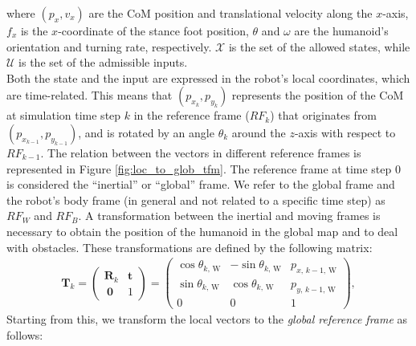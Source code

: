 where $(p_x, v_x)$ are the CoM position and translational velocity along the $x$-axis, $f_x$ is the $x$-coordinate of the stance foot position, $\theta$ and $\omega$ are the humanoid's orientation and turning rate, respectively. $\mathcal{X}$ is the set of the allowed states, while $\mathcal{U}$ is the set of the admissible inputs.\\
Both the state and the input are expressed in the robot's local coordinates, which are time-related. This means that $(p_{x_k}, p_{y_k})$ represents the position of the CoM at simulation time step $k$ in the reference frame ($RF_k$) that originates from $(p_{x_{k-1}}, p_{y_{k-1}})$, and is rotated by an angle $\theta_k$ around the $z$-axis with respect to $RF_{k-1}$. The relation between the vectors in different reference frames is represented in Figure \ref{fig:loc_to_glob_tfm}.
The reference frame at time step 0 is considered the ``inertial'' or ``global'' frame. We refer to the global frame and the robot's body frame (in general and not related to a specific time step) as $RF_W$ and $RF_B$. A transformation between the inertial and moving frames is necessary to obtain the position of the humanoid in the global map and to deal with obstacles. These transformations are defined by the following matrix:
\begin{align}
    \mathbf{T}_k = 
    \begin{pmatrix}
        \mathbf{R}_k & \mathbf{t} \\[1ex]
        \ \mathbf{0} & 1
    \end{pmatrix}
    =
    \begin{pmatrix}
        \cos\theta_{k,\, \text{W}} & -\sin\theta_{k,\, \text{W}} & p_{x,\,k-1,\,\text{W}} \\
        \sin\theta_{k,\, \text{W}} & \cos\theta_{k,\, \text{W}} &  p_{y,\,k-1,\,\text{W}} \\
        0 & 0 & 1
    \end{pmatrix},
\end{align}
Starting from this, we transform the local vectors to the \textit{global reference frame} as follows:
